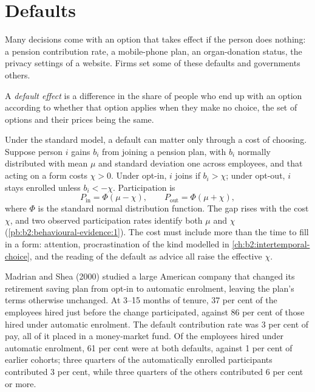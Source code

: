 \section{Defaults}\label{sec:b2:behavioural-evidence:defaults}

Many decisions come with an option that takes effect if the person does nothing: a pension contribution
rate, a mobile-phone plan, an organ-donation status, the privacy settings of a website. Firms set some of
these defaults and governments others.

\begin{definition}\label{def:b2:behavioural-evidence:default-effect}
A \emph{default effect} is a difference in the share of people who end up with an
option according to whether that option applies when they make no choice, the set of options and their
prices being the same.
\end{definition}

Under the standard model, a default can matter only through a cost of choosing. Suppose person $i$
gains $b_i$ from joining a pension plan, with $b_i$ normally distributed with mean $\mu$ and standard
deviation one across employees, and that acting on a form costs $\chi > 0$. Under opt-in, $i$ joins if
$b_i > \chi$; under opt-out, $i$ stays enrolled unless $b_i < -\chi$. Participation is
\[
P_{\text{in}} = \Phi(\mu - \chi), \qquad P_{\text{out}} = \Phi(\mu + \chi),
\]
where $\Phi$ is the standard normal distribution function. The gap rises with the cost $\chi$, and two
observed participation rates identify both $\mu$ and $\chi$ (\cref{pb:b2:behavioural-evidence:1}). The
cost must include more than the time to fill in a form: attention, procrastination of the kind modelled
in \cref{ch:b2:intertemporal-choice}, and the reading of the default as advice all raise the effective
$\chi$.

\begin{record}
Madrian and Shea (2000) studied a large American company that changed its retirement saving plan from
opt-in to automatic enrolment, leaving the plan's terms otherwise unchanged. At 3--15 months of tenure,
37 per cent of the employees hired just before the change participated, against 86 per cent of those
hired under automatic enrolment. The default contribution rate was 3 per cent of pay, all of it placed
in a money-market fund. Of the employees hired under automatic enrolment, 61 per cent were at both
defaults, against 1 per cent of earlier cohorts; three quarters of the automatically enrolled
participants contributed 3 per cent, while three quarters of the others contributed 6 per cent or more.
\end{record}

